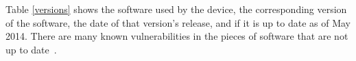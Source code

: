 \documentclass[letterpaper,twocolumn,10pt]{article}
\begin{document}
Table \ref{versions} shows the software used by the device, the corresponding version of the software, the date of that version's release, and if it is up to date as of May 2014.  There are many known vulnerabilities in the pieces of software that are not up to date~\cite{cve1, cve2, cve3}.  

%
%
\end{document}
